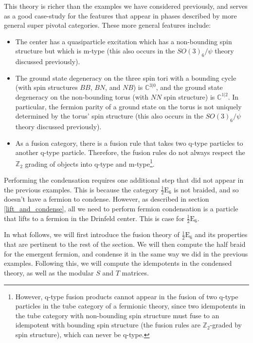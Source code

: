 \documentclass[12pt,a4paper]{article}
\newcommand{\zt}{\mathbb{Z}_2}
\newcommand{\halfesix}{\frac{1}{2}\text{E}_6}
\begin{document}
This theory is richer than the examples we have considered previously, and serves as a good 
case-study for the features that appear in phases described by more general super pivotal 
categories. 
These more general features include:
\begin{itemize}
\item The center has a quasiparticle excitation which has a non-bounding spin structure but which is m-type (this also occurs in the $SO(3)_6/\psi$ theory discussed previously).
\item The ground state degeneracy on the three spin tori with a bounding cycle (with spin structures $BB$, $BN$, and $NB$) is $\mathbb{C}^{3|0}$, and the ground state degeneracy on the non-bounding torus (with $NN$ spin structure) is $\mathbb{C}^{1|2}$.
In particular, the fermion parity of a ground state on the torus is not uniquely determined by the torus' spin structure (this also occurs in the $SO(3)_6/\psi$ theory discussed previously). 
 \item As a fusion category, there is a fusion rule that takes two q-type particles to another q-type particle. 
Therefore, the fusion rules do not always respect the $\zt$ grading of objects into q-type and m-type\footnote{However, q-type fusion products cannot appear in the fusion of two q-type particles in the tube
category of a fermionic theory, since two idempotents in the tube category with non-bounding spin 
structure must fuse to an idempotent with bounding spin structure (the fusion rules are $\zt$-graded by spin structure), which can never be q-type.}. 
\end{itemize}

Performing the condensation requires one additional step that did not appear in the previous examples. 
This is because the category $\halfesix$ is not braided, and so doesn't have a fermion to condense.
However, as described in section \ref{lift_and_condense}, all we need to perform fermion condensation 
is a particle that lifts to a fermion in the Drinfeld center. 
This is case for $\halfesix$.

In what follows, we will first introduce the fusion theory of $\halfesix$ and its properties that are pertinent to the rest of the section.
We will then compute the half braid for the emergent fermion, and condense it in the same way we did in the previous examples.
Following this, we will compute the idempotents in the condensed theory, 
as well as the modular $S$ and $T$ matrices. 
\end{document}

